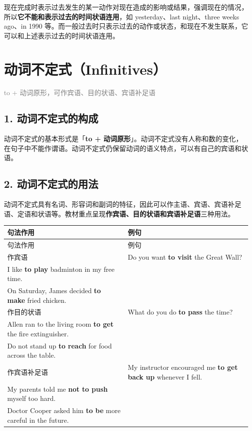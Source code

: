 \documentclass[11pt,a4paper]{ctexart}
\begin{document}
现在完成时表示过去发生的某一动作对现在造成的影响或结果，强调现在的情况，所以\textbf{它不能和表示过去的时间状语连用}，如 yesterday、last night、three weeks ago、in 1990 等。而一般过去时只表示过去的动作或状态，和现在不发生联系，它可以和上述表示过去的时间状语连用。

\section{动词不定式（Infinitives）}
\noindent\textcolor{gray}{to + 动词原形，可作宾语、目的状语、宾语补足语}\par\smallskip
\subsection*{1. 动词不定式的构成}

动词不定式的基本形式是「\textbf{to + 动词原形}」。动词不定式没有人称和数的变化，在句子中不能作谓语。动词不定式仍保留动词的语义特点，可以有自己的宾语和状语。

\subsection*{2. 动词不定式的用法}

动词不定式具有名词、形容词和副词的特征，因此可以作主语、宾语、宾语补足语、定语和状语等。教材重点呈现\textbf{作宾语、目的状语和宾语补足语}三种用法。

{\footnotesize
\begin{longtable}{p{6.70cm}p{6.70cm}}
\hline
句法作用 & 例句 \\
\hline
\endfirsthead
\hline
句法作用 & 例句 \\
\hline
\endhead
\hline
\endfoot
作宾语 & Do you want \textbf{to visit} the Great Wall?\\ I like \textbf{to play} badminton in my free time.\\ On Saturday, James decided \textbf{to make} fried chicken. \\
作目的状语 & What do you do \textbf{to pass} the time?\\ Allen ran to the living room \textbf{to get} the fire extinguisher.\\ Do not stand up \textbf{to reach} for food across the table. \\
作宾语补足语 & My instructor encouraged me \textbf{to get back up} whenever I fell.\\ My parents told me \textbf{not to push} myself too hard.\\ Doctor Cooper asked him \textbf{to be} more careful in the future. \\
\end{longtable}
}
\end{document}
